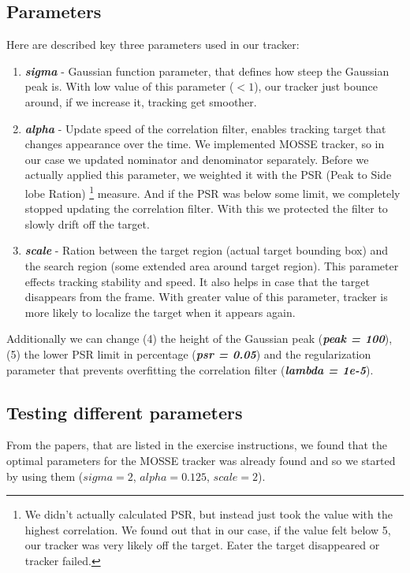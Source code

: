 \documentclass[runningheads]{llncs}
\begin{document}
\subsection{Parameters}
Here are described key three parameters used in our tracker: 
\begin{enumerate}
    \item \textbf{\textit{sigma}} - Gaussian function parameter, that defines how steep the Gaussian peak is. With low value of this parameter ($< 1$), our tracker just bounce around, if we increase it, tracking get smoother.
    \item \textbf{\textit{alpha}} - Update speed of the correlation filter, enables tracking target that changes appearance over the time. We implemented MOSSE tracker, so in our case we updated nominator and denominator separately. Before we actually applied this parameter, we weighted it with the PSR (Peak to Side lobe Ration) \footnote{We didn't actually calculated PSR, but instead just took the value with the highest correlation. We found out that in our case, if the value felt below 5, our tracker was very likely off the target. Eater the target disappeared or tracker failed.} measure. And if the PSR was below some limit, we completely stopped updating the correlation filter. With this we protected the filter to slowly drift off the target.
    \item \textbf{\textit{scale}} - Ration between the target region (actual target bounding box) and the search region (some extended area around target region). This parameter effects tracking stability and speed. It also helps in case that the target disappears from the frame. With greater value of this parameter, tracker is more likely to localize the target when it appears again.  
\end{enumerate}

Additionally we can change (4) the height of the Gaussian peak (\textbf{\textit{peak = 100}}), (5) the lower PSR limit in percentage (\textbf{\textit{psr = 0.05}}) and the regularization parameter that prevents overfitting the correlation filter (\textbf{\textit{lambda = 1e-5}}).

\subsection{Testing different parameters}
From the papers, that are listed in the exercise instructions, we found that the optimal parameters for the MOSSE tracker was already found and so we started by using them ($sigma = 2$, $alpha = 0.125$, $scale = 2$). 
\end{document}

